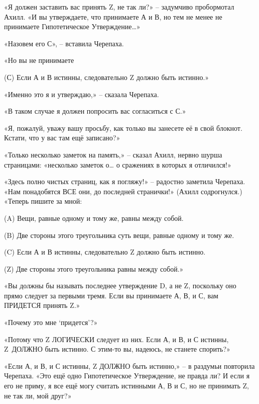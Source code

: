 \documentclass[../main.tex]{subfiles}
\begin{document}
\begin{Dialogue}
«Я должен заставить вас принять Z, не так ли?» \--- задумчиво пробормотал Ахилл. «И вы утверждаете, что принимаете А и В, но тем не менее не принимаете Гипотетическое Утверждение\ldots»

«Назовем его С», \--- вставила Черепаха.

«Но вы не принимаете

\begin{statements}
    \item[(С)] Если А и В истинны, следовательно Z должно быть истинно.»
\end{statements}

«Именно это я и утверждаю,» \--- сказала Черепаха.

«В таком случае я должен попросить вас согласиться с С.»

«Я, пожалуй, уважу вашу просьбу, как только вы занесете её в свой блокнот. Кстати, что у вас там ещё записано?»

«Только несколько заметок на память,» \--- сказал Ахилл, нервно шурша страницами: «несколько заметок о\ldots{} о сражениях в которых я отличился!»

«Здесь полно чистых страниц, как я погляжу!» \--- радостно заметила Черепаха. «Нам понадобятся ВСЕ они, до последней странички!» (Ахилл содрогнулся.) «Теперь пишите за мной:

\begin{statements}
    \item[(A)] Вещи, равные одному и тому же, равны между собой.
    \item[(B)] Две стороны этого треугольника суть вещи, равные одному и тому же.
    \item[(C)] Если А и В истинны, следовательно Z должно быть истинно.
    \item[(Z)] Две стороны этого треугольника равны между собой.»
\end{statements}

«Вы должны бы называть последнее утверждение D, а не Z, поскольку оно прямо следует за первыми тремя. Если вы принимаете А, В, и С, вам ПРИДЕТСЯ принять Z.»

«Почему это мне \enquote*{придется}?»

«Потому что Z ЛОГИЧЕСКИ следует из них. Если А, и В, и С истинны, Z~ДОЛЖНО быть истинно. С этим-то вы, надеюсь, не станете спорить?»

«Если А, и В, и С истинны, Z ДОЛЖНО быть истинно,» \--- в раздумьи повторила Черепаха. «Это ещё одно Гипотетическое Утверждение, не правда ли? И если я его не приму, я все ещё могу считать истинными А, В и С, но не принимать Z, не так ли, мой друг?»


\end{Dialogue}
\end{document}
